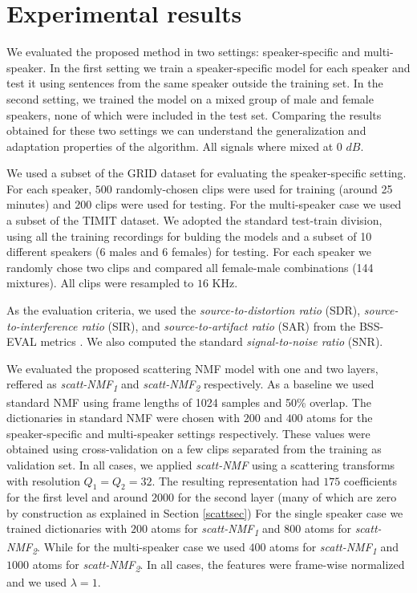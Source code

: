 \section{Experimental results}
\label{sec:experiments}

 We evaluated the proposed method in two settings: speaker-specific and multi-speaker. In the first setting 
we train a speaker-specific model for each speaker and test it using sentences from the same speaker outside the training set. 
In the second setting, we trained the model on a mixed group of male and female speakers, none of which were included in the test set.
Comparing the results obtained for these two settings we can understand the generalization and adaptation properties of the algorithm. 
All signals where mixed at 0 $dB$.

 We used a subset of the GRID dataset \cite{cooke2006audio} for evaluating the speaker-specific setting.
For each speaker, $500$ randomly-chosen clips were used for training (around 25 minutes) and $200$ clips were used for testing.
For the multi-speaker case we used a subset of the TIMIT dataset. We adopted the standard test-train division, using all the training recordings for bulding the models
and a subset of 10 different speakers (6 males and 6 females) for testing. For each speaker we randomly chose two clips and compared
all female-male combinations (144 mixtures). All clips were resampled to $16$ KHz. 

 As the evaluation criteria, we used the \emph{source-to-distortion ratio} (SDR), \emph{source-to-interference ratio} (SIR), and
\emph{source-to-artifact ratio} (SAR) from the BSS-EVAL metrics \cite{vincent2006performance}. 
%
We also computed the standard \emph{signal-to-noise ratio} (SNR).
%

 We evaluated the proposed scattering NMF model with one and two layers, reffered
as \emph{scatt-NMF\textsubscript{1}} and \emph{scatt-NMF\textsubscript{2}} respectively. As a baseline we used standard NMF 
using frame lengths of 1024 samples and 50\% overlap. 
%
The dictionaries in standard NMF were chosen with $200$ and $400$ atoms for the speaker-specific and multi-speaker
settings respectively. These values were obtained using cross-validation on a few clips separated from the training as validation set.
%
In all cases, we applied \emph{scatt-NMF} using a scattering transforms with resolution $Q_1= Q_2 = 32$.
The resulting representation had $175$ coefficients for the first level and around $2000$ for the second layer (many of which are
zero by construction as explained in Section \ref{scattsec})
%
For the single speaker case we trained dictionaries with $200$ atoms for \emph{scatt-NMF\textsubscript{1}}  and $800$ atoms for \emph{scatt-NMF\textsubscript{2}}.
While for the multi-speaker case we used $400$ atoms for \emph{scatt-NMF\textsubscript{1}}  and $1000$ atoms for \emph{scatt-NMF\textsubscript{2}}.
In all cases, the features were frame-wise normalized and we used $\lambda=1$. 

